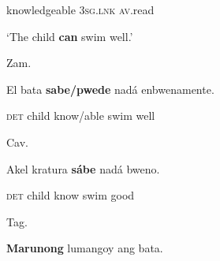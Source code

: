 \begin{stylelsIMT}
knowledgeable 3\textsc{sg.lnk} \textsc{av}.read
\end{stylelsIMT}

\begin{listWWNumiileveli}
\item 
\begin{stylelsLanginfo}
‘The child \textbf{can} swim well.’
\end{stylelsLanginfo}

\begin{listWWNumiilevelii}
\item 
\begin{stylelsLanginfo}
Zam.
\end{stylelsLanginfo}
\end{listWWNumiilevelii}
\end{listWWNumiileveli}
\begin{stylelsSourceline}
El bata \textbf{sabe/pwede} nadá enbwenamente.
\end{stylelsSourceline}

\begin{stylelsIMT}
\textsc{det} child know/able swim well
\end{stylelsIMT}

\begin{listWWNumiileveli}
\item 
\begin{listWWNumiilevelii}
\item 
\begin{stylelsLanginfo}
Cav.
\end{stylelsLanginfo}
\end{listWWNumiilevelii}
\end{listWWNumiileveli}
\begin{stylelsSourceline}
Akel kratura \textbf{sábe} nadá bweno.
\end{stylelsSourceline}

\begin{stylelsIMT}
\textsc{det} child know swim good
\end{stylelsIMT}

\begin{listWWNumiileveli}
\item 
\begin{listWWNumiilevelii}
\item 
\begin{stylelsLanginfo}
Tag.
\end{stylelsLanginfo}
\end{listWWNumiilevelii}
\end{listWWNumiileveli}
\begin{stylelsSourceline}
\textbf{Marunong} lumangoy ang bata.
\end{stylelsSourceline}

